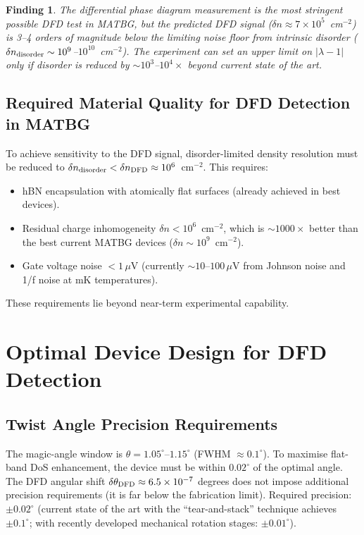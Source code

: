 \documentclass[11pt]{article}
\newtheorem{finding}{Finding}
\newcommand{\ee}[1]{\times 10^{#1}}
\begin{document}
\begin{finding}
  \label{find:smoking_gun}
  The differential phase diagram measurement is the most stringent possible
  DFD test in MATBG, but the predicted DFD signal ($\delta n \approx
  7\ee{5}$~cm$^{-2}$) is 3--4 orders of magnitude below the limiting
  noise floor from intrinsic disorder ($\delta n_{\rm disorder} \sim
  10^9$--$10^{10}$~cm$^{-2}$). The experiment can set an upper limit on
  $|\lambda-1|$ only if disorder is reduced by $\sim 10^3$--$10^4\times$
  beyond current state of the art.
\end{finding}

\subsection{Required Material Quality for DFD Detection in MATBG}

To achieve sensitivity to the DFD signal, disorder-limited density
resolution must be reduced to $\delta n_{\rm disorder} < \delta n_{\rm DFD}
\approx 10^6$~cm$^{-2}$. This requires:
\begin{itemize}
  \item hBN encapsulation with atomically flat surfaces (already achieved
    in best devices).
  \item Residual charge inhomogeneity $\delta n < 10^6$~cm$^{-2}$, which
    is $\sim 1000\times$ better than the best current MATBG devices
    ($\delta n \sim 10^9$~cm$^{-2}$).
  \item Gate voltage noise $< 1\,\mu$V (currently $\sim 10$--$100\,\mu$V
    from Johnson noise and 1/f noise at mK temperatures).
\end{itemize}
These requirements lie beyond near-term experimental capability.

\section{Optimal Device Design for DFD Detection}
\label{sec:device_design}

\subsection{Twist Angle Precision Requirements}

The magic-angle window is $\theta = 1.05^\circ$--$1.15^\circ$ (FWHM
$\approx 0.1^\circ$). To maximise flat-band DoS enhancement, the device
must be within $0.02^\circ$ of the optimal angle. The DFD angular shift
$\delta\theta_{\rm DFD} \approx 6.5\ee{-7}$ degrees does not impose
additional precision requirements (it is far below the fabrication limit).
Required precision: $\pm 0.02^\circ$ (current state of the art with the
``tear-and-stack'' technique achieves $\pm 0.1^\circ$; with recently
developed mechanical rotation stages: $\pm 0.01^\circ$).
\end{document}
